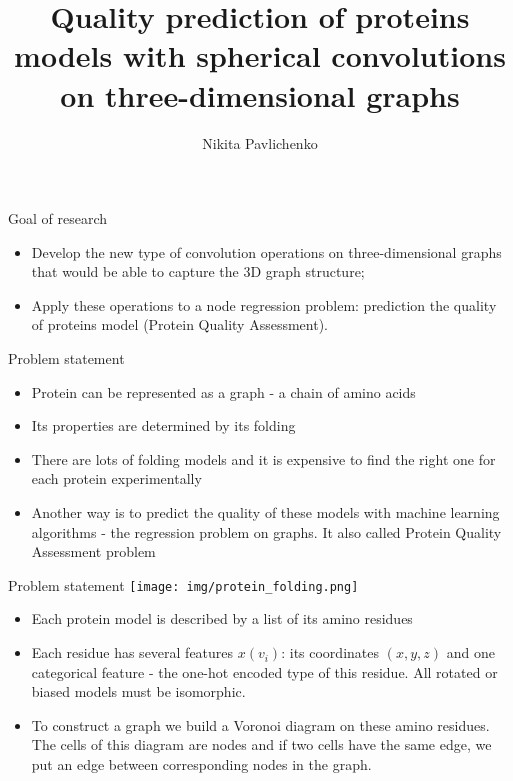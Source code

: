 \documentclass{beamer}
\title[\hbox to 56mm{Spherical convolutions  \hfill\insertframenumber\,/\,\inserttotalframenumber}]
{Quality prediction of proteins models with spherical convolutions on three-dimensional graphs}
\author[N.\,V.~Pavlichenko]{Nikita Pavlichenko}
\institute{Moscow Institute of Physics and Technology}
\date{\footnotesize{
\par\emph{Course:} My first scientific paper\par Group 793, 2020
\par\emph{Consultants:} I. Igashov, S. Grudinin
\date{qq}
}}
\begin{document}
\begin{frame}
\titlepage
\end{frame}
\begin{frame}{Goal of research}
        \begin{itemize}
            \item Develop the new type of convolution operations on three-dimensional graphs that would be able to
            capture the 3D graph structure;
            \item Apply these operations to a node regression problem: prediction the quality of proteins model (Protein Quality Assessment).
        \end{itemize}
\end{frame}
\begin{frame}{Problem statement}
    \begin{itemize}
        \item Protein can be represented as a graph - a chain of amino acids
        \item Its properties are determined by its folding
        \item There are lots of folding models and it is expensive to find the right one for each protein experimentally
        \item Another way is to predict the quality of these models with machine learning algorithms - the regression problem on graphs.
        It also called Protein Quality Assessment problem
    \end{itemize}
\end{frame}

\begin{frame}{Problem statement}
    \texttt{[image: img/protein\_folding.png]}
    \begin{itemize}
        \item Each protein model is described by a list of its amino residues
        \item Each residue has several features $x(v_i)$: its coordinates $(x, y, z)$ and one categorical feature - the one-hot encoded type of this residue.
        All rotated or biased models must be isomorphic.
        \item To construct a graph we build a Voronoi diagram on these amino residues. The cells of this diagram are nodes and
        if two cells have the same edge, we put an edge between corresponding nodes in the graph.
    \end{itemize}
\end{frame}
\end{document}
